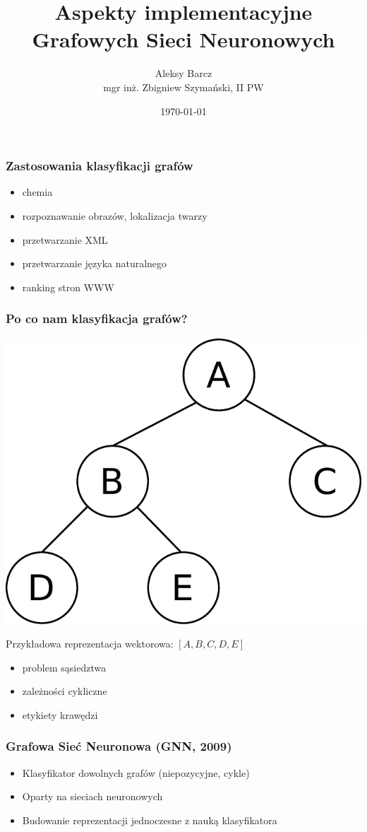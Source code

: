 \documentclass{beamer}
\author{Aleksy Barcz\\mgr inż. Zbigniew Szymański, II PW}
\title{Aspekty implementacyjne\\Grafowych Sieci Neuronowych}
\date{\today}
\begin{document}
\frame{\titlepage}

\begin{frame}
\frametitle{Zastosowania klasyfikacji grafów}
\begin{itemize}
	\item chemia
	\item rozpoznawanie obrazów, lokalizacja twarzy
	\item przetwarzanie XML
	\item przetwarzanie języka naturalnego
	\item ranking stron WWW
\end{itemize}
\end{frame}

\begin{frame}
\frametitle{Po co nam klasyfikacja grafów?}
\begin{center}
	\includegraphics[scale=0.4]{img/tree}
\end{center}
Przykładowa reprezentacja wektorowa: $[A, B, C, D, E]$
\begin{itemize}
	\item problem sąsiedztwa
	\item zależności cykliczne
	\item etykiety krawędzi
\end{itemize}
\end{frame}

\begin{frame}
\frametitle{Grafowa Sieć Neuronowa (GNN, 2009)}
\begin{itemize}
	\item Klasyfikator dowolnych grafów (niepozycyjne, cykle)
	\item Oparty na sieciach neuronowych
	\item Budowanie reprezentacji jednoczesne z nauką klasyfikatora
\end{itemize}
\end{frame}
\end{document}
